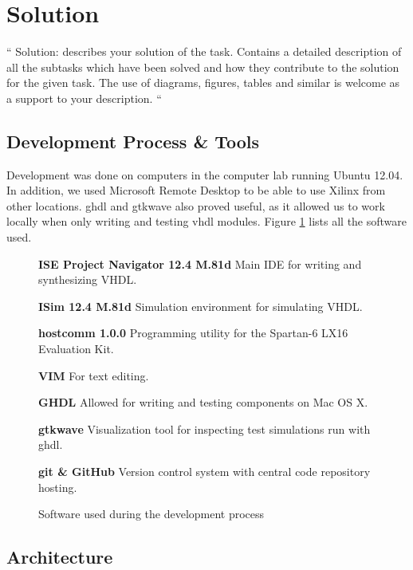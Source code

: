 \section{Solution}

``
Solution: describes your solution of the task.
Contains a detailed description of all the subtasks which have been solved and how they contribute to the solution for the given task.
The use of diagrams, figures, tables and similar is welcome as a support to your description.
``

\subsection{Development Process \& Tools}

Development was done on computers in the computer lab running Ubuntu 12.04.
In addition, we used Microsoft Remote Desktop to be able to use Xilinx from other locations.
ghdl and gtkwave also proved useful, as it allowed us to work locally when only writing and testing vhdl modules. Figure \ref{fig:software} lists all the software used.

\begin{figure}[ht!]
    \begin{description}
        \item{\textbf{ISE Project Navigator 12.4 M.81d}}
            Main IDE for writing and synthesizing VHDL.
        \item{\textbf{ISim 12.4 M.81d}}
            Simulation environment for simulating VHDL.
        \item{\textbf{hostcomm 1.0.0}}
            Programming utility for the Spartan-6 LX16 Evaluation Kit.
        \item{\textbf{VIM}}
            For text editing.
        \item{\textbf{GHDL}}
            Allowed for writing and testing components on Mac OS X.
        \item{\textbf{gtkwave}}
            Visualization tool for inspecting test simulations run with ghdl.
        \item{\textbf{git \& GitHub}}
            Version control system with central code repository hosting.
    \label{fig:software}
    \end{description}
    \caption{Software used during the development process}
\end{figure}

\subsection{Architecture}

